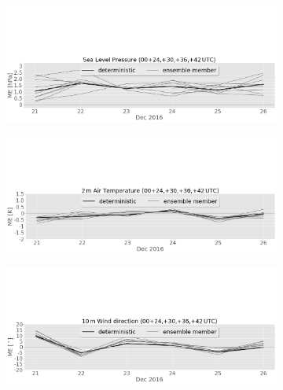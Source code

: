 \begin{figure}[H]%
	\centering
	\begin{subfigure}[b]{\textwidth}
		\includegraphics[trim={0cm 0cm 0cm 9.5cm},clip,width=\textwidth]{./fig_sfc_pressure/ME_20161220_26_00}
		\caption{}\label{fig:bias:pres}
	\end{subfigure}
	\begin{subfigure}[b]{\textwidth}
		\includegraphics[trim={0cm 0cm 0cm 9.5cm},clip,width=\textwidth]{./fig_sfc_temp/ME_20161220_26_00}
		\caption{}\label{fig:bias:temp}
	\end{subfigure}
	\begin{subfigure}[b]{\textwidth}
		\includegraphics[trim={0cm 0cm 0cm 9.5cm},clip,width=\textwidth]{./fig_sfc_wd/ME_20161220_26_00}
		\caption{}\label{fig:bias:wd}
	\end{subfigure}

\end{figure}

